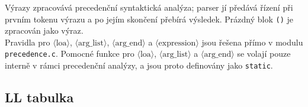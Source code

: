 \documentclass[11pt,a4paper]{article}
\newcommand{\tk}[1]{\texttt{#1}}
\begin{document}
 \newpage
\noindent Výrazy zpracovává precedenční syntaktická analýza; parser jí předává řízení
při prvním tokenu výrazu a po jejím skončení přebírá výsledek.
Prázdný blok \tk{()} je zpracován jako výraz. \\
Pravidla pro $\langle \text{loa} \rangle$, $\langle \text{arg\_list} \rangle$, $\langle \text{arg\_end} \rangle$ a $\langle \text{expression} \rangle$ jsou řešena přímo v modulu \texttt{precedence.c}. Pomocné funkce pro $\langle \text{loa} \rangle$, $\langle \text{arg\_list} \rangle$ a $\langle \text{arg\_end} \rangle$ se volají pouze interně v rámci precedenční analýzy, a jsou proto definovány jako \texttt{static}.
 

\subsection{LL tabulka }
\end{document}
